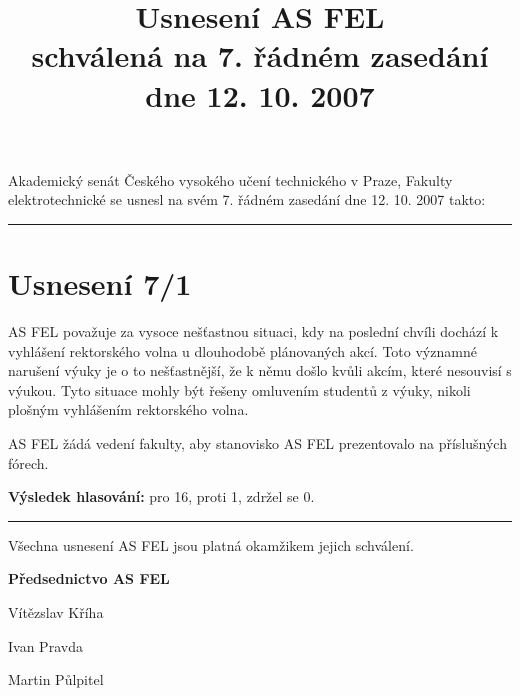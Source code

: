 \documentclass[a4paper,12pt,notitlepage]{article}
\title{Usnesení AS FEL\\schválená na 7. řádném zasedání dne 12. 10. 2007}
\author{}\date{}
\newcommand{\hr}{\bigskip\hrule\bigskip}
\newcommand{\usneseni}[5]{
\section*{#1}

#2

\textbf{Výsledek hlasování:} pro #3, proti #4, zdržel se #5.}
\begin{document}
\maketitle
\thispagestyle{empty}


Akademický senát Českého vysokého učení technického v Praze, Fakulty
elektrotechnické se usnesl na svém 7. řádném zasedání dne 12. 10. 2007 takto:\hr


\usneseni{Usnesení 7/1}{AS FEL považuje za vysoce nešťastnou situaci, kdy na poslední chvíli dochází k vyhlášení rektorského volna u dlouhodobě plánovaných akcí. Toto významné narušení výuky je o to nešťastnější, že k němu došlo kvůli akcím, které nesouvisí s výukou. Tyto situace mohly být řešeny omluvením studentů z výuky, nikoli plošným vyhlášením rektorského volna. 

AS FEL žádá vedení fakulty, aby stanovisko AS FEL prezentovalo na příslušných fórech.}{16}{1}{0}

\hr
Všechna usnesení AS FEL jsou platná okamžikem jejich schválení.

\begin{center}
\textbf{Předsednictvo AS FEL}

Vítězslav Kříha

Ivan Pravda

Martin Půlpitel
\end{center}
\end{document}
